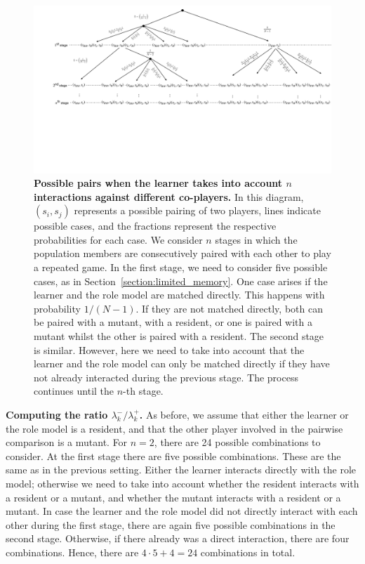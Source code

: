 \documentclass[11pt]{article}
\def\strategy{s}
\theoremstyle{plainCl1}
\theoremstyle{plainCl2}
\begin{document}

\begin{figure}[t]
  \centering 
  \includegraphics[width=\textwidth]{static/matching_tree.pdf}
  \caption{\textbf{Possible pairs when the learner takes into account $n$ interactions against different co-players.} 
  In this diagram, \((\strategy_i, \strategy_j)\) represents a possible pairing of two players, lines indicate possible cases, and the fractions represent the respective probabilities for each case. 
  We consider $n$ stages in which the population members are consecutively paired with each other to play a repeated game. 
  In the first stage, we need to consider five possible cases, as in Section~\ref{section:limited_memory}.
  One case arises if the learner and the role model are matched directly. 
  This happens with probability $1/(N\!-\!1)$.
  If they are not matched directly, both can be paired with a mutant, with a resident, or one is paired with a mutant
  whilst the other is paired with a resident.
  The second stage is similar. 
  However, here we need to take into account that the learner and the role model can only be matched directly if they have not already interacted during the previous stage. 
  The process continues until the $n$-th stage.}\label{fig:matching_tree}
\end{figure}


\noindent
{\bf Computing the ratio $\lambda^-_k/\lambda^+_k$.}
As before, we assume that either the learner or the role model is a resident, and that the other player involved in the pairwise comparison is a mutant. For $n\!=\!2$, there are 24 possible combinations to consider. 
At the first stage there are five possible combinations. 
These are the same as in the previous setting. 
Either the learner interacts directly with the role model; otherwise we need to take into account whether the resident interacts with a resident or a mutant, and whether the mutant interacts with a resident or a mutant. 
In case the learner and the role model did not directly interact with each other during the first stage, there are again five possible combinations in the second stage. 
Otherwise, if there already was a direct interaction, there are four combinations. 
Hence, there are $4\!\cdot\!5 + 4=24$ combinations in total. 
\end{document}
